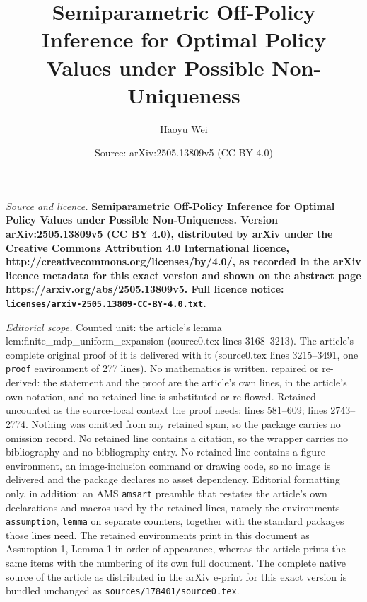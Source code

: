 \documentclass[10pt,a4paper]{amsart}
\title{\bf Semiparametric Off-Policy Inference for Optimal Policy Values under Possible Non-Uniqueness}
\author{Haoyu Wei}
\date{Source: arXiv:2505.13809v5 (CC BY 4.0)}
\begin{document}
\maketitle

\noindent\emph{Source and licence.} \bf Semiparametric Off-Policy Inference for Optimal Policy Values under Possible Non-Uniqueness. Version arXiv:2505.13809v5 (CC BY 4.0), distributed by arXiv under the Creative Commons Attribution 4.0 International licence, http://creativecommons.org/licenses/by/4.0/, as recorded in the arXiv licence metadata for this exact version and shown on the abstract page https://arxiv.org/abs/2505.13809v5. Full licence notice: \texttt{licenses/arxiv-2505.13809-CC-BY-4.0.txt}.\par\smallskip

\noindent\textit{Editorial scope.} Counted unit: the article's lemma lem:finite\_mdp\_uniform\_expansion (source0.tex lines 3168--3213). The article's complete original proof of it is delivered with it (source0.tex lines 3215--3491, one \texttt{proof} environment of 277 lines). No mathematics is written, repaired or re-derived: the statement and the proof are the article's own lines, in the article's own notation, and no retained line is substituted or re-flowed.  Retained uncounted as the source-local context the proof needs: lines 581--609; lines 2743--2774.  Nothing was omitted from any retained span, so the package carries no omission record.  No retained line contains a citation, so the wrapper carries no bibliography and no bibliography entry.  No retained line contains a figure environment, an image-inclusion command or drawing code, so no image is delivered and the package declares no asset dependency.  Editorial formatting only, in addition: an AMS \texttt{amsart} preamble that restates the article's own declarations and macros used by the retained lines, namely the environments \texttt{assumption}, \texttt{lemma} on separate counters, together with the standard packages those lines need.  The retained environments print in this document as Assumption 1, Lemma 1 in order of appearance, whereas the article prints the same items with the numbering of its own full document.  The complete native source of the article as distributed in the arXiv e-print for this exact version is bundled unchanged as \texttt{sources/178401/source0.tex}.
\end{document}
